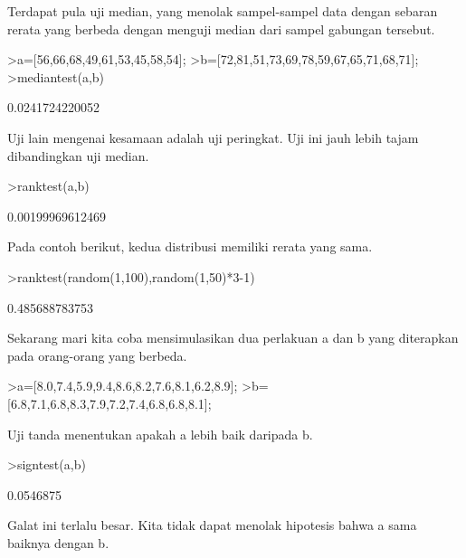 \documentclass{article}
\newenvironment{eulernotebook}{\par}{\par}
\newenvironment{eulercomment}{\par\medskip}{\par\medskip}
\begin{document}
\begin{eulernotebook}
\begin{eulercomment}
\begin{eulercomment}
\begin{eulercomment}
Terdapat pula uji median, yang menolak sampel-sampel data dengan
sebaran rerata yang berbeda dengan menguji median dari sampel gabungan
tersebut.
\end{eulercomment}
\begin{eulerprompt}
>a=[56,66,68,49,61,53,45,58,54];
>b=[72,81,51,73,69,78,59,67,65,71,68,71];
>mediantest(a,b)
\end{eulerprompt}
\begin{euleroutput}
  0.0241724220052
\end{euleroutput}
\begin{eulercomment}
Uji lain mengenai kesamaan adalah uji peringkat. Uji ini jauh lebih
tajam dibandingkan uji median.
\end{eulercomment}
\begin{eulerprompt}
>ranktest(a,b)
\end{eulerprompt}
\begin{euleroutput}
  0.00199969612469
\end{euleroutput}
\begin{eulercomment}
Pada contoh berikut, kedua distribusi memiliki rerata yang sama.
\end{eulercomment}
\begin{eulerprompt}
>ranktest(random(1,100),random(1,50)*3-1)
\end{eulerprompt}
\begin{euleroutput}
  0.485688783753
\end{euleroutput}
\begin{eulercomment}
Sekarang mari kita coba mensimulasikan dua perlakuan a dan b yang
diterapkan pada orang-orang yang berbeda.
\end{eulercomment}
\begin{eulerprompt}
>a=[8.0,7.4,5.9,9.4,8.6,8.2,7.6,8.1,6.2,8.9];
>b=[6.8,7.1,6.8,8.3,7.9,7.2,7.4,6.8,6.8,8.1];
\end{eulerprompt}
\begin{eulercomment}
Uji tanda menentukan apakah a lebih baik daripada b.
\end{eulercomment}
\begin{eulerprompt}
>signtest(a,b)
\end{eulerprompt}
\begin{euleroutput}
  0.0546875
\end{euleroutput}
\begin{eulercomment}
Galat ini terlalu besar. Kita tidak dapat menolak hipotesis bahwa a
sama baiknya dengan b.


\end{eulercomment}
\end{eulercomment}
\end{eulercomment}
\end{eulernotebook}
\end{document}
